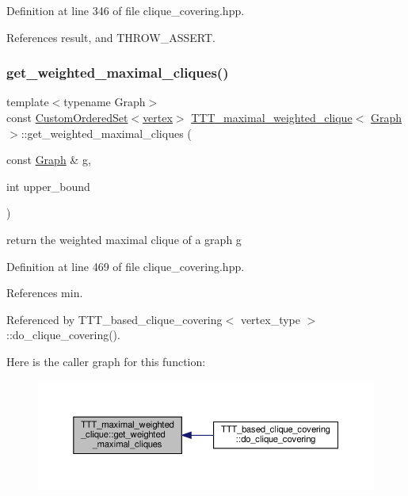 Definition at line 346 of file clique\+\_\+covering.\+hpp.



References result, and T\+H\+R\+O\+W\+\_\+\+A\+S\+S\+E\+RT.

\mbox{\label{classTTT__maximal__weighted__clique_a4c64ff7e98d014725a49619e95dff252}} 
\subsubsection{\texorpdfstring{get\+\_\+weighted\+\_\+maximal\+\_\+cliques()}{get\_weighted\_maximal\_cliques()}}
{\footnotesize\ttfamily template$<$typename Graph$>$ \\
const \hyperlink{classCustomOrderedSet}{Custom\+Ordered\+Set}$<$\hyperlink{classTTT__maximal__weighted__clique_ac6a30ba8fb726c9c83eafe9dc451a799}{vertex}$>$ \hyperlink{classTTT__maximal__weighted__clique}{T\+T\+T\+\_\+maximal\+\_\+weighted\+\_\+clique}$<$ \hyperlink{structGraph}{Graph} $>$\+::get\+\_\+weighted\+\_\+maximal\+\_\+cliques (\begin{DoxyParamCaption}\item[{const \hyperlink{structGraph}{Graph} \&}]{g,  }\item[{int}]{upper\+\_\+bound }\end{DoxyParamCaption})\hspace{0.3cm}{\ttfamily [inline]}}



return the weighted maximal clique of a graph g 



Definition at line 469 of file clique\+\_\+covering.\+hpp.



References min.



Referenced by T\+T\+T\+\_\+based\+\_\+clique\+\_\+covering$<$ vertex\+\_\+type $>$\+::do\+\_\+clique\+\_\+covering().

Here is the caller graph for this function\+:
\nopagebreak
\begin{figure}[H]
\begin{center}
\leavevmode
\includegraphics[width=350pt]{df/d1e/classTTT__maximal__weighted__clique_a4c64ff7e98d014725a49619e95dff252_icgraph}
\end{center}
\end{figure}


